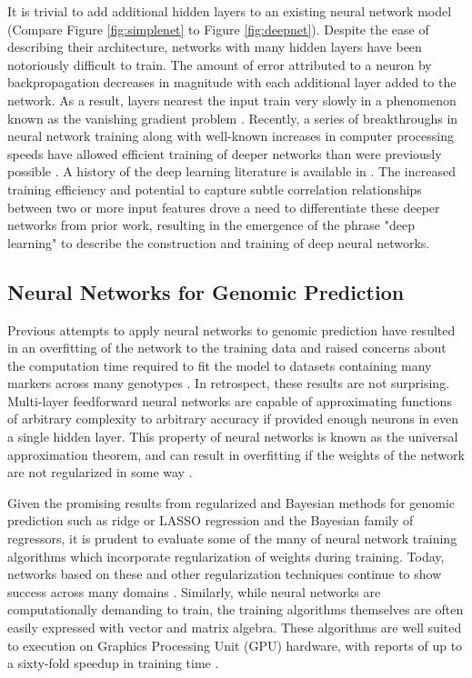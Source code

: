 
It is trivial to add additional hidden layers to an existing neural network 
model (Compare Figure \ref{fig:simplenet} to Figure \ref{fig:deepnet}). 
Despite the ease of describing their architecture, networks with many hidden 
layers have been notoriously difficult to train. The amount of error
attributed to a neuron by backpropagation decreases in magnitude with each
additional layer added to the network. As a result, layers nearest the input train
very slowly in a phenomenon known as the vanishing gradient problem \citep{hochreiter1998}. 
Recently, a series of breakthroughs in neural network training along with well-known
increases in computer processing speeds have allowed efficient training
of deeper networks than were previously possible \citep{sutskever2013}.
A history of the deep learning literature is available in \cite{lecun2015}.
The increased training efficiency and potential to capture subtle
correlation relationships between two or more input features drove a need to 
differentiate these deeper networks from prior work, resulting in 
the emergence of the phrase "deep learning" to describe the construction 
and training of deep neural networks.

\subsection*{Neural Networks for Genomic Prediction}

Previous attempts to apply neural networks to genomic prediction have resulted in 
an overfitting of the network to the training data and raised 
concerns about the computation time required to fit the model to datasets containing
many markers across many genotypes \citep{heslot2012, gonzalez-recio2014}. 
In retrospect, these results are not surprising. Multi-layer feedforward neural networks 
are capable of approximating functions of arbitrary complexity to arbitrary 
accuracy if provided enough neurons in even a single hidden 
layer. This property of neural networks is known as the 
universal approximation theorem, and can result in
overfitting if the weights of the network are not regularized in some way \citep{hornik1989}.

Given the promising results from regularized and Bayesian methods for
genomic prediction such as ridge or LASSO regression and the Bayesian family of regressors,
it is prudent to evaluate some of the many of neural network training algorithms which
incorporate regularization of weights during training. Today, networks based on these
and other regularization techniques continue to show success
across many domains \citep{schmidhuber2015}. Similarly, while neural networks are 
computationally demanding to train, the training algorithms 
themselves are often easily expressed with vector and matrix algebra. These algorithms are 
well suited to execution on Graphics Processing Unit (GPU) hardware, with reports 
of up to a sixty-fold speedup in training time \citep{sierra2010, schmidhuber2015}. 

